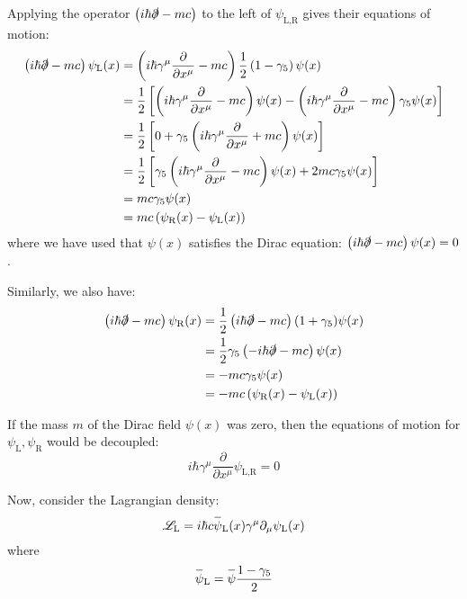 \documentclass[letterpaper,12pt]{article}
\newenvironment{problem}{\subsection{}\begin{adjustwidth}{0.25in}{}\vspace{-\baselineskip}}{\end{adjustwidth}}
\newcommand{\pder}[2]{\frac{\partial #1}{\partial #2}}
\newcommand{\lagr}{\mathscr{L}}
\newcommand{\overbar}[1]{
	\mkern 1.5mu \overline{\mkern-1.5mu\raisebox{0pt}[\dimexpr\height+0.5mm\relax]{$#1$}\mkern-1.5mu}\mkern 1.5mu
}
\begin{document}
\begin{problem}
Applying the operator $\left(i\hbar\slashed{\partial}-mc\right)$ to the left of $\psi_{\text{L},\text{R}}$ gives their equations of motion:
\begin{align*}
	\left(i\hbar\slashed{\partial}-mc\right)\psi_\text{L}(x)
	&= \left(i\hbar\gamma^\mu\pder{}{x^\mu}-mc\right) \frac{1}{2}\left(1-\gamma_5\right)\psi(x)	\\
	&= \frac{1}{2} \left[\left(i\hbar\gamma^\mu\pder{}{x^\mu}-mc\right)\psi(x)
	- \left(i\hbar\gamma^\mu\pder{}{x^\mu}-mc\right)\gamma_5\psi(x)\right]	\\
	&= \frac{1}{2} \left[0 + \gamma_5 \left(i\hbar\gamma^\mu\pder{}{x^\mu} + mc\right)\psi(x)\right]	\\
	&= \frac{1}{2} \left[\gamma_5\left(i\hbar\gamma^\mu\pder{}{x^\mu}-mc\right)\psi(x) + 2mc\gamma_5 \psi(x)\right]	\\
	&= mc\gamma_5\psi(x)	\\
	&= mc\left(\psi_\text{R}(x) - \psi_\text{L}(x)\right)
\end{align*}
where we have used that $\psi(x)$ satisfies the Dirac equation: $\left(i\hbar\slashed{\partial}-mc\right)\psi(x)=0$.

Similarly, we also have:
\begin{align*}
	\left(i\hbar\slashed{\partial} - mc\right) \psi_\text{R}(x)
	&= \frac{1}{2}\left(i\hbar\slashed{\partial} - mc\right)(1+\gamma_5) \psi(x)	\\
	&= \frac{1}{2}\gamma_5\left(-i\hbar\slashed{\partial}-mc\right)\psi(x)	\\
	&= -mc\gamma_5\psi(x)	\\
	&= -mc\left(\psi_\text{R}(x) - \psi_\text{L}(x)\right)
\end{align*}

If the mass $m$ of the Dirac field $\psi(x)$ was zero, then the equations of motion for $\psi_\text{L}, \psi_\text{R}$ would be decoupled:
\begin{equation*}
	i\hbar\gamma^\mu\pder{}{x^\mu}\psi_{\text{L},\text{R}} = 0
\end{equation*}

Now, consider the Lagrangian density:
\begin{equation*}
	\lagr_\text{L} = i\hbar c \overbar{\psi}_\text{L}(x) \gamma^\mu \partial_\mu \psi_\text{L}(x)
\end{equation*}
where
\begin{equation*}
	\overbar{\psi}_\text{L} = \overbar{\psi} \frac{1-\gamma_5}{2}
\end{equation*}


\end{problem}
\end{document}
